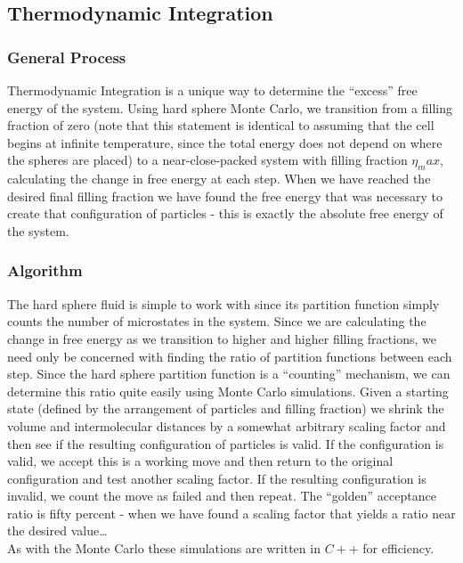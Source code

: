 \documentclass[12pt]{article}
\begin{document}


\subsection{Thermodynamic Integration}
\subsubsection{General Process}
Thermodynamic Integration is a unique way to determine the ``excess'' free energy of the system. Using hard sphere Monte Carlo, we transition from a filling fraction of zero (note that this statement is identical to assuming that the cell begins at infinite temperature, since the total energy does not depend on where the spheres are placed) to a near-close-packed system with filling fraction $\eta_max$, calculating the change in free energy at each step. When we have reached the desired final filling fraction we have found the free energy that was necessary to create that configuration of particles - this is exactly the absolute free energy of the system.\\
\subsubsection{Algorithm}
The hard sphere fluid is simple to work with since its partition function simply counts the number of microstates in the system\cite{valeskethesis}. Since we are calculating the change in free energy as we transition to higher and higher filling fractions, we need only be concerned with finding the ratio of partition functions between each step. Since the hard sphere partition function is a ``counting'' mechanism, we can determine this ratio quite easily using Monte Carlo simulations. Given a starting state (defined by the arrangement of particles and filling fraction) we shrink the volume and intermolecular distances by a somewhat arbitrary scaling factor and then see if the resulting configuration of particles is valid. If the configuration is valid, we accept this is a working move and then return to the original configuration and test another scaling factor. If the resulting configuration is invalid, we count the move as failed and then repeat. The ``golden'' acceptance ratio is fifty percent - when we have found a scaling factor that yields a ratio near the desired value\dots\\

As with the Monte Carlo these simulations are written in $C++$ for efficiency. 
\end{document}
